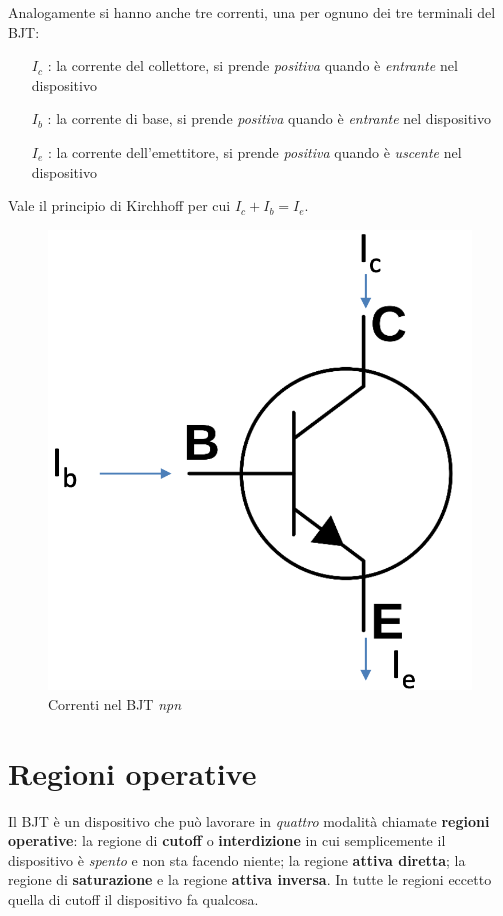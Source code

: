 \documentclass[12pt, a4paper]{report}
\begin{document}
Analogamente si hanno anche tre correnti, una per ognuno dei tre terminali del BJT:
\begin{itemize}
    \item[$I_{c}$]: la corrente del collettore, si prende \textit{positiva} quando è \textit{entrante} nel dispositivo
    \item[$I_{b}$]: la corrente di base, si prende \textit{positiva} quando è \textit{entrante} nel dispositivo
    \item[$I_{e}$]: la corrente dell'emettitore, si prende \textit{positiva} quando è \textit{uscente} nel dispositivo
\end{itemize}
Vale il principio di Kirchhoff per cui $I_{c} + I_{b} = I_{e}$.
\begin{figure}[h]
    \centering
    \includegraphics[scale=0.35,angle=0]{bjt_correnti.png}
    \caption{Correnti nel BJT \textit{npn}}
\end{figure}

\section{Regioni operative}
Il BJT è un dispositivo che può lavorare in \textit{quattro} modalità chiamate \textbf{regioni operative}: la regione di \textbf{cutoff} o \textbf{interdizione} in cui semplicemente il dispositivo è \textit{spento} e non sta facendo niente; la regione \textbf{attiva diretta}; la regione di \textbf{saturazione} e la regione \textbf{attiva inversa}. In tutte le regioni eccetto quella di cutoff il dispositivo fa qualcosa.
\end{document}
